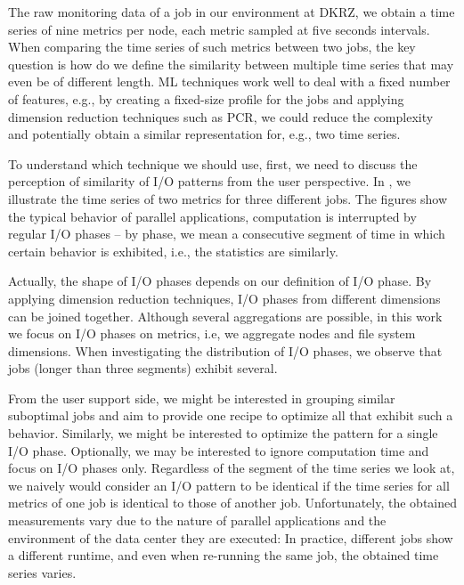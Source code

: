 \documentclass{jhps}
\begin{document}
The raw monitoring data of a job in our environment at DKRZ, we obtain a time series of nine metrics per node, each metric sampled at five seconds intervals.
When comparing the time series of such metrics between two jobs, the key question is how do we define the similarity between multiple time series that may even be of different length.
ML techniques work well to deal with a fixed number of features, e.g., by creating a fixed-size profile for the jobs and applying dimension reduction techniques such as PCR, we could reduce the complexity and potentially obtain a similar representation for, e.g., two time series.

To understand which technique we should use, first, we need to discuss the perception of similarity of I/O patterns from the user perspective.
In , we illustrate the time series of two metrics for three different jobs.
The figures show the typical behavior of parallel applications, computation is interrupted by regular I/O phases -- by phase, we mean a consecutive segment of time in which  certain behavior is exhibited, i.e., the statistics are similarly.

Actually, the shape of I/O phases depends on our definition of I/O phase.
By applying dimension reduction techniques, I/O phases from different dimensions can be joined together.
Although several aggregations are possible, in this work we focus on  I/O phases on metrics, i.e, we aggregate nodes and file system dimensions.
When investigating the distribution of I/O phases, we observe that jobs (longer than three segments) exhibit  several.

From the user support side, we might be interested in grouping similar suboptimal jobs and aim to provide one recipe to optimize all that exhibit such a behavior.
Similarly, we might be interested to optimize the pattern for a single I/O phase.
Optionally, we may be interested to ignore computation time and focus on I/O phases only.
Regardless of the segment of the time series we look at, we naively would consider an I/O pattern to be identical if the time series for all metrics of one job is identical to those of another job.
Unfortunately, the obtained measurements vary due to the nature of parallel applications and the environment of the data center they are executed:
In practice, different jobs show a different runtime, and even when re-running the same job, the obtained time series varies.
\end{document}
